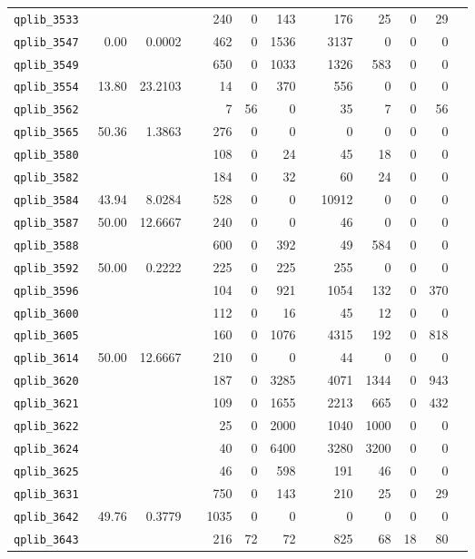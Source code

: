 \begin{longtable}{lrrrrrrrrrrrr}
{\tt 	qplib\_3533	}	&		&		&	&	240	&	0	&	143	&	&	176	&	25	&	0	&	29	\\
{\tt 	qplib\_3547	}	&	0.00	&	0.0002	&	&	462	&	0	&	1536	&	&	3137	&	0	&	0	&	0	\\
{\tt 	qplib\_3549	}	&		&		&	&	650	&	0	&	1033	&	&	1326	&	583	&	0	&	0	\\
{\tt 	qplib\_3554	}	&	13.80	&	23.2103	&	&	14	&	0	&	370	&	&	556	&	0	&	0	&	0	\\
{\tt 	qplib\_3562	}	&		&		&	&	7	&	56	&	0	&	&	35	&	7	&	0	&	56	\\
{\tt 	qplib\_3565	}	&	50.36	&	1.3863	&	&	276	&	0	&	0	&	&	0	&	0	&	0	&	0	\\
{\tt 	qplib\_3580	}	&		&		&	&	108	&	0	&	24	&	&	45	&	18	&	0	&	0	\\
{\tt 	qplib\_3582	}	&		&		&	&	184	&	0	&	32	&	&	60	&	24	&	0	&	0	\\
{\tt 	qplib\_3584	}	&	43.94	&	8.0284	&	&	528	&	0	&	0	&	&	10912	&	0	&	0	&	0	\\
{\tt 	qplib\_3587	}	&	50.00	&	12.6667	&	&	240	&	0	&	0	&	&	46	&	0	&	0	&	0	\\
{\tt 	qplib\_3588	}	&		&		&	&	600	&	0	&	392	&	&	49	&	584	&	0	&	0	\\
{\tt 	qplib\_3592	}	&	50.00	&	0.2222	&	&	225	&	0	&	225	&	&	255	&	0	&	0	&	0	\\
{\tt 	qplib\_3596	}	&		&		&	&	104	&	0	&	921	&	&	1054	&	132	&	0	&	370	\\
{\tt 	qplib\_3600	}	&		&		&	&	112	&	0	&	16	&	&	45	&	12	&	0	&	0	\\
{\tt 	qplib\_3605	}	&		&		&	&	160	&	0	&	1076	&	&	4315	&	192	&	0	&	818	\\
{\tt 	qplib\_3614	}	&	50.00	&	12.6667	&	&	210	&	0	&	0	&	&	44	&	0	&	0	&	0	\\
{\tt 	qplib\_3620	}	&		&		&	&	187	&	0	&	3285	&	&	4071	&	1344	&	0	&	943	\\
{\tt 	qplib\_3621	}	&		&		&	&	109	&	0	&	1655	&	&	2213	&	665	&	0	&	432	\\
{\tt 	qplib\_3622	}	&		&		&	&	25	&	0	&	2000	&	&	1040	&	1000	&	0	&	0	\\
{\tt 	qplib\_3624	}	&		&		&	&	40	&	0	&	6400	&	&	3280	&	3200	&	0	&	0	\\
{\tt 	qplib\_3625	}	&		&		&	&	46	&	0	&	598	&	&	191	&	46	&	0	&	0	\\
{\tt 	qplib\_3631	}	&		&		&	&	750	&	0	&	143	&	&	210	&	25	&	0	&	29	\\
{\tt 	qplib\_3642	}	&	49.76	&	0.3779	&	&	1035	&	0	&	0	&	&	0	&	0	&	0	&	0	\\
{\tt 	qplib\_3643	}	&		&		&	&	216	&	72	&	72	&	&	825	&	68	&	18	&	80	\\

\end{longtable}
